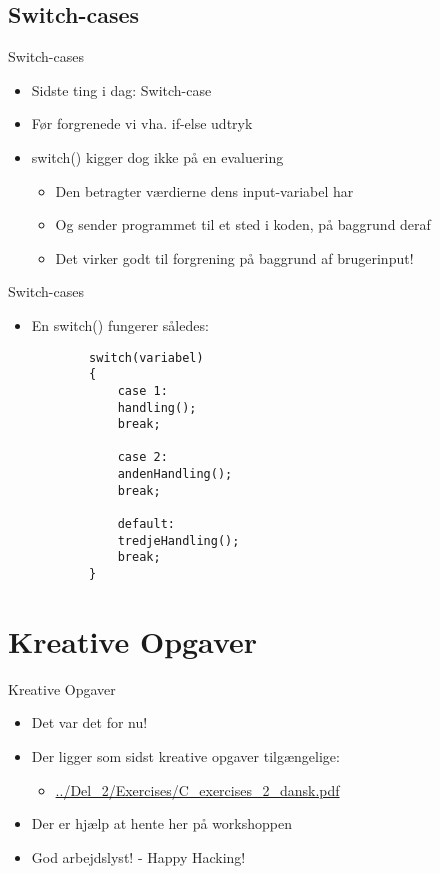 \documentclass{beamer}
\begin{document}

\subsection{Switch-cases}

\begin{frame}[fragile]{Switch-cases}
	\begin{itemize}
		\item{Sidste ting i dag: {\color{dkgreen}Switch-case}}
		\item{Før forgrenede vi vha. if-else udtryk}
		\item{{\color{C_darkblue}switch}() kigger dog ikke på en evaluering}
		\begin{itemize}
			\item{Den betragter værdierne dens input-variabel har}
			\item{Og sender programmet til et sted i koden, på baggrund deraf}
			\item{Det virker godt til forgrening på baggrund af brugerinput!}
		\end{itemize}
	\end{itemize}
\end{frame}


\begin{frame}[fragile]{Switch-cases}
	\begin{itemize}
		\item{En {\color{C_darkblue}switch}() fungerer således:}
		\begin{lstlisting}
		switch(variabel)
		{
			case 1:
			handling();
			break;
			
			case 2:
			andenHandling();
			break;
			
			default:
			tredjeHandling();
			break;
		}
		\end{lstlisting}
	\end{itemize}
\end{frame}

\section{Kreative Opgaver}
\begin{frame}{Kreative Opgaver}
	\begin{itemize}
	\item{Det var det for nu!}
	\item{Der ligger som sidst kreative opgaver tilgængelige:}
		\begin{itemize}
		\item{\color{link}\href{https://github.com/Iakop/C-Programmering-for-begyndere/tree/master/Del_2/Exercises/C_exercises_2_dansk.pdf}{../Del\_2/Exercises/C\_exercises\_2\_dansk.pdf}}
		\end{itemize}
	\item{Der er hjælp at hente her på workshoppen}
	\item{God arbejdslyst! - Happy Hacking!}
	\end{itemize}
\end{frame}
\end{document}
